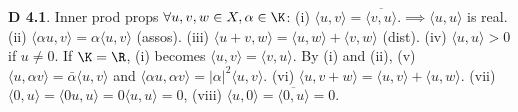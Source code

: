 {\bf D 4.1}. Inner prod props  $\forall u,v,w \in X, \alpha \in \K$: (i) $\langle u,v\rangle=\overline{\langle v,u\rangle}. \implies \langle u,u\rangle$ is real. (ii) $\langle \alpha u,v\rangle = \alpha \langle u,v\rangle$ (assos). (iii) $\langle u+v,w\rangle=\langle u,w\rangle+\langle v,w\rangle$ (dist). (iv) $\langle u,u\rangle > 0$ if $u \neq 0$. If $\K=\R$, (i) becomes $\langle u,v\rangle=\langle v,u\rangle$. By (i) and (ii), (v) $\langle u, \alpha v\rangle=\bar{\alpha}\langle u,v\rangle$ and $\langle \alpha u,\alpha v\rangle=|\alpha|^2\langle u,v\rangle$. (vi) $\langle u,v+w\rangle=\langle u,v\rangle+\langle u,w\rangle$.  (vii) $\langle 0,u\rangle=\langle 0u,u\rangle=0\langle u,u\rangle=0$, (viii) $\langle u,0\rangle= \overline{\langle 0,u\rangle}=0$. 
